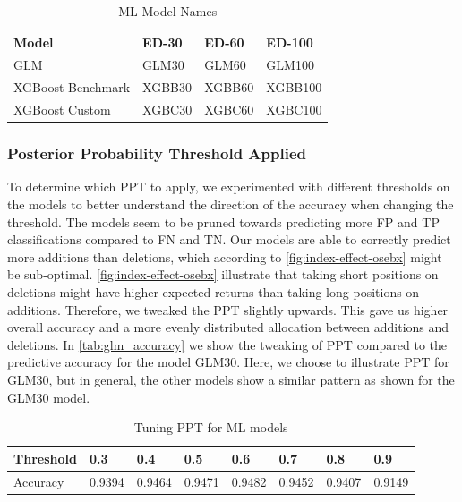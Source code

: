 \begin{table}[H]
\centering
\footnotesize
\begin{tabularx}{\textwidth}{lXXX}
\hline
Model                    & ED-30     & ED-60     & ED-100 \\
\hline
GLM                     & GLM30     & GLM60     & GLM100 \\
XGBoost Benchmark       & XGBB30    & XGBB60    & XGBB100 \\
XGBoost Custom          & XGBC30    & XGBC60    & XGBC100 \\
\hline
\end{tabularx}
\vspace{1em}
\caption{{ML Model Names}}
\label{tab:machine-learning-model-names}
\end{table}

\subsubsection{Posterior Probability Threshold Applied}

To determine which PPT to apply, we experimented with different thresholds on the models to better understand the direction of the accuracy when changing the threshold. The models seem to be pruned towards predicting more FP and TP classifications compared to FN and TN. Our models are able to correctly predict more additions than deletions, which according to \autoref{fig:index-effect-osebx} might be sub-optimal. \autoref{fig:index-effect-osebx} illustrate that taking short positions on deletions might have higher expected returns than taking long positions on additions. Therefore, we tweaked the PPT slightly upwards. This gave us higher overall accuracy and a more evenly distributed allocation between additions and deletions. In \autoref{tab:glm_accuracy} we show the tweaking of PPT compared to the predictive accuracy for the model GLM30. Here, we choose to illustrate PPT for GLM30, but in general, the other models show a similar pattern as shown for the GLM30 model. 
\vspace{2em}
\begin{table}[H]
\centering
\begin{tabular}{llllllll}
  \hline
Threshold & 0.3 & 0.4 & 0.5 & 0.6 & 0.7 & 0.8& 0.9  \\
\midrule
Accuracy & 0.9394 & 0.9464 & 0.9471 & 0.9482 & 0.9452 & 0.9407 & 0.9149\\
   \hline
\end{tabular}
\vspace{1em}
\caption{{Tuning PPT for ML models}}
\label{tab:glm_accuracy}
\end{table}

